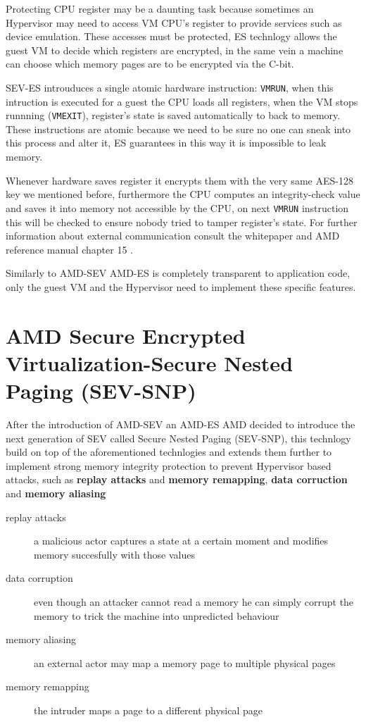 \documentclass[twocolumn]{article}
\begin{document}
    Protecting CPU register may be a daunting task because sometimes an Hypervisor may need to access VM CPU's register to provide services such as device emulation. These accesses must be protected, ES technlogy allows the guest VM to decide which registers are encrypted, in the same vein a machine can choose which memory pages are to be encrypted via the C-bit.

    SEV-ES introuduces a single atomic hardware instruction: \texttt{VMRUN}, when this intruction is executed for a guest the CPU loads all registers, when the VM stops runnning (\texttt{VMEXIT}), register's state is saved automatically to  back to memory. These instructions are atomic because we need to be sure no one can sneak into this process and alter it, ES guarantees in this way it is impossible to leak memory.

    Whenever hardware saves register it encrypts them with the very same AES-128 key we mentioned before, furthermore the CPU computes an integrity-check value and saves it into memory not accessible by the CPU, on next \texttt{VMRUN} instruction this will be checked to ensure nobody tried to tamper register's state. For further information about external communication consult the whitepaper \cite{protecting-registers} and AMD reference manual chapter 15 \cite{architecture-reference}.

    Similarly to AMD-SEV AMD-ES is completely transparent to application code, only the guest VM and the Hypervisor need to implement these specific features.

\section{AMD Secure Encrypted Virtualization-Secure Nested Paging (SEV-SNP)}

    After the introduction of AMD-SEV an AMD-ES AMD decided to introduce the next generation of SEV called Secure Nested Paging (SEV-SNP), this technlogy build on top of the aforementioned technlogies and extends them further to implement strong memory integrity protection to prevent Hypervisor based attacks, such as \textbf{replay attacks} and \textbf{memory remapping}, \textbf{data corruction} and \textbf{memory aliasing}

    \begin{description}
        \item[replay attacks] a malicious actor captures a state at a certain moment and modifies memory succesfully with those values
        \item[data corruption] even though an attacker cannot read a memory he can simply corrupt the memory to trick the machine into unpredicted behaviour
        \item[memory aliasing] an external actor may map a memory page to multiple physical pages
        \item[memory remapping] the intruder maps a page to a different physical page
    \end{description}
\end{document}
